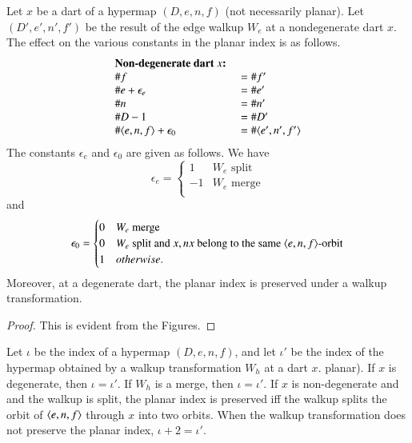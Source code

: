 \begin{lemma}\label{lemma:index} Let $x$ be a dart of a hypermap $(D,e,n,f)$ (not necessarily
planar). Let $(D',e',n',f')$ be the result of the edge walkup $W_e$ at
a nondegenerate dart $x$.  
The effect on the various constants in the planar index is as
follows.
    $$
    \begin{array}{lll}
    \text{\bf Non-degenerate dart $x$: }&\\
    \# f &= \# f'\\  
    \# e + \epsilon_e &= \# e'\\
    \# n &= \# n'\\
    \# D - 1&= \# D' \\
    \# \langle e,n,f\rangle + \epsilon_0&= \#\langle e',n',f'\rangle\\
    \end{array}
    $$
The constants $\epsilon_e$ and $\epsilon_0$ are given as follows.
We have 
   $$
   \epsilon_e = \begin{cases}
     1 & W_e \text{ split }\\
    -1 & W_e \text{ merge}\\
   \end{cases}
   $$
and
   $$
   \epsilon_0 = \begin{cases}
    0 & W_e \text{ merge }\\
    0 & W_e \text{ split and } x,nx \text{ belong to the same } \langle e,n,f\rangle\text{-orbit}\\
    1 & otherwise.
     \end{cases}
   $$
Moreover, at a degenerate dart, the planar index is preserved under a
walkup transformation.
\end{lemma}

\begin{proof} This is evident from the Figures.
\end{proof}

\begin{lemma}  Let $\iota$ be the index of a  hypermap $(D,e,n,f)$, and
let $\iota'$ be the index of the hypermap obtained by a walkup transformation
$W_h$
at a dart $x$.
planar).   If $x$ is degenerate, then $\iota=\iota'$.
If $W_h$ is a merge, then $\iota=\iota'$.
If $x$ is non-degenerate and and the walkup is
split, the planar index is preserved iff the walkup splits the orbit of
$\langle e,n,f\rangle$ through $x$ into two orbits. When the walkup transformation
does not preserve the planar index, $\iota+2=\iota'$.
\end{lemma}

